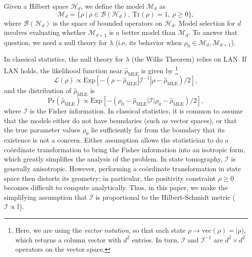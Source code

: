 \documentclass[aps,pra, twocolumn]{revtex4-1}
\newcommand{\M}{\mathcal{M}}
\newcommand{\cH}{\mathcal{H}}
\newcommand{\rhohat}{\hat{\rho}}
\newcommand{\rhoMLE}{\rhohat_{\scriptscriptstyle\mathrm{MLE}}}
\begin{document}
Given a Hilbert space $\cH_{d}$, we define the model $\mathcal{M}_{d}$ as
\begin{equation}
\mathcal{M}_{d} = \{\rho~|~\rho \in \mathcal{B}(\mathcal{H}_{d}),~\mathrm{Tr}(\rho) =1,~\rho \geq 0\},
\end{equation}
where $\mathcal{B}(\cH_{d})$ is the space of bounded operators on $\cH_{d}$. Model selection for $d$ involves evaluating whether $\M_{d + 1}$ is a better model than $\M_{d}$. To answer that question, we need a null theory for $\lambda$ (i.e, its behavior when $\rho_{0} \in \M_{d},\M_{d + 1}$).

In classical statistics, the null theory for $\lambda$ (the Wilks Theorem) relies on LAN.  If LAN holds, the likelihood function near $\rhoMLE$ is given by \footnote{Here, we are using the \emph{vector notation}, so that each state $\rho \rightarrow \mathrm{vec}(\rho) = |\rho)$, which returns a column vector with $d^{2}$ entries. In turn, $\mathcal{I}$ and $\mathcal{I}^{-1}$ are $d^{2}\times d^{2}$ operators on the vector space.}
\begin{equation}
\mathcal{L}(\rho) \propto \text{Exp}\left[-(\rho - \rhoMLE|\mathcal{I}^{-1}|\rho - \rhoMLE)/2\right],
\end{equation}
and the distribution of $\rhoMLE$ is
\begin{equation}
\mathrm{Pr}(\rhoMLE) \propto \text{Exp}\left[-(\rho_{0} - \rhoMLE|\mathcal{I}|\rho_{0} - \rhoMLE)/2\right],
\end{equation}
where $\mathcal{I}$ is the Fisher information. In classical statistics, it is common to assume that the models either do not have boundaries (such as vector spaces), or that the true parameter values $\rho_{0}$ lie sufficiently far from the boundary that its existence is not a concern. Either assumption allows the statistician to do a co\"{o}rdinate transformation to bring the Fisher information into an isotropic form, which greatly simplifies the analysis of the problem. In state tomography, $\mathcal{I}$ is generally anisotropic.  However, performing a co\"{o}rdinate transformation in state space then distorts its geometry; in particular, the positivity constraint $\rho \geq 0$ becomes difficult to compute analytically. Thus, in this paper, we make the simplifying assumption that $\mathcal{I}$ is proportional to the Hilbert-Schmidt metric ($\mathcal{I} \propto \mathbb{I}$).  
\end{document}
